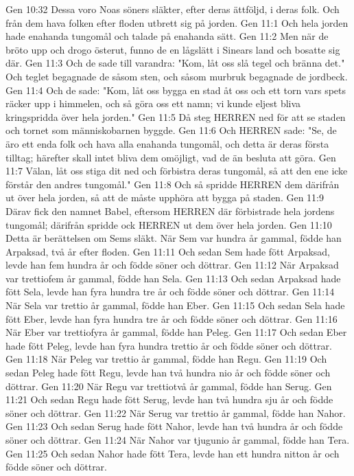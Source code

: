 Gen 10:32  Dessa voro Noas söners släkter, efter deras ättföljd, i deras folk. Och från dem hava folken efter floden utbrett sig på jorden.
Gen 11:1  Och hela jorden hade enahanda tungomål och talade på enahanda sätt.
Gen 11:2  Men när de bröto upp och drogo österut, funno de en lågslätt i Sinears land och bosatte sig där.
Gen 11:3  Och de sade till varandra: "Kom, låt oss slå tegel och bränna det." Och teglet begagnade de såsom sten, och såsom murbruk begagnade de jordbeck.
Gen 11:4  Och de sade: "Kom, låt oss bygga en stad åt oss och ett torn vars spets räcker upp i himmelen, och så göra oss ett namn; vi kunde eljest bliva kringspridda över hela jorden."
Gen 11:5  Då steg HERREN ned för att se staden och tornet som människobarnen byggde.
Gen 11:6  Och HERREN sade: "Se, de äro ett enda folk och hava alla enahanda tungomål, och detta är deras första tilltag; härefter skall intet bliva dem omöjligt, vad de än besluta att göra.
Gen 11:7  Välan, låt oss stiga dit ned och förbistra deras tungomål, så att den ene icke förstår den andres tungomål."
Gen 11:8  Och så spridde HERREN dem därifrån ut över hela jorden, så att de måste upphöra att bygga på staden.
Gen 11:9  Därav fick den namnet Babel, eftersom HERREN där förbistrade hela jordens tungomål; därifrån spridde ock HERREN ut dem över hela jorden.
Gen 11:10  Detta är berättelsen om Sems släkt. När Sem var hundra år gammal, födde han Arpaksad, två år efter floden.
Gen 11:11  Och sedan Sem hade fött Arpaksad, levde han fem hundra år och födde söner och döttrar.
Gen 11:12  När Arpaksad var trettiofem år gammal, födde han Sela.
Gen 11:13  Och sedan Arpaksad hade fött Sela, levde han fyra hundra tre år och födde söner och döttrar.
Gen 11:14  När Sela var trettio år gammal, födde han Eber.
Gen 11:15  Och sedan Sela hade fött Eber, levde han fyra hundra tre år och födde söner och döttrar.
Gen 11:16  När Eber var trettiofyra år gammal, födde han Peleg.
Gen 11:17  Och sedan Eber hade fött Peleg, levde han fyra hundra trettio år och födde söner och döttrar.
Gen 11:18  När Peleg var trettio år gammal, födde han Regu.
Gen 11:19  Och sedan Peleg hade fött Regu, levde han två hundra nio år och födde söner och döttrar.
Gen 11:20  När Regu var trettiotvå år gammal, födde han Serug.
Gen 11:21  Och sedan Regu hade fött Serug, levde han två hundra sju år och födde söner och döttrar.
Gen 11:22  När Serug var trettio år gammal, födde han Nahor.
Gen 11:23  Och sedan Serug hade fött Nahor, levde han två hundra år och födde söner och döttrar.
Gen 11:24  När Nahor var tjugunio år gammal, födde han Tera.
Gen 11:25  Och sedan Nahor hade fött Tera, levde han ett hundra nitton år och födde söner och döttrar.
